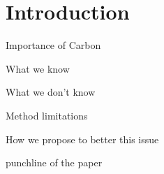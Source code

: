 \section{Introduction} 
Importance of Carbon 


What we know 


What we don't know


Method limitations


How we propose to better this issue


punchline of the paper 